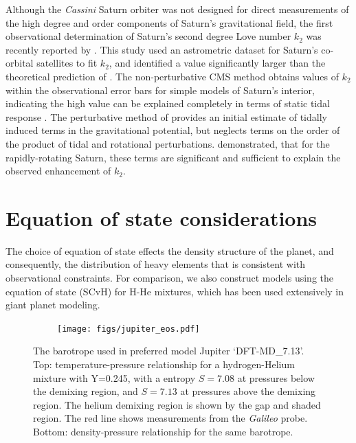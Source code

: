 Although the \textit{Cassini} Saturn orbiter was not designed for direct measurements
of the high degree and order components of Saturn's gravitational field, the first observational
determination of Saturn's second degree Love number $k_2$ was recently reported by
\citet{lainey2016}. This study used an astrometric dataset for Saturn's co-orbital
satellites to fit $k_2$, and identified a value significantly larger than the
theoretical prediction of \citet{gavrilov1977}. The non-perturbative CMS method
obtains values of $k_2$ within the observational error bars for simple models of
Saturn's interior, indicating the high value can be explained completely in terms of
static tidal response \citep{wahl2016}. The perturbative method of
\citet{gavrilov1977} provides an initial estimate of tidally induced terms in the
gravitational potential, but neglects terms on the order of the product of tidal
and rotational perturbations. \citet{wahl2016} demonstrated, that for the
rapidly-rotating Saturn, these terms are significant and sufficient to explain the
observed enhancement of $k_2$.

\section{Equation of state considerations}
The choice of equation of state effects the density structure of the planet, and
consequently, the distribution of heavy elements that is consistent with observational
constraints. For comparison, we also construct models using the \citet{saumon1995}
equation of state (SCvH) for H-He mixtures, which has been used extensively in giant planet
modeling. 

\begin{figure}[h!]  
  \centering
    \texttt{[image: figs/jupiter\_eos.pdf]}
\caption{ The barotrope used in preferred model Jupiter `DFT-MD\_7.13'. Top:
    temperature-pressure relationship for a hydrogen-Helium mixture with Y=0.245,
    with a entropy $S=7.08$ at pressures below the demixing region, and $S=7.13$ at
    pressures above the demixing region. The helium demixing region is shown by the
    gap and shaded region. The red line shows measurements from the \textit{Galileo}
probe. Bottom: density-pressure relationship for the same barotrope.}
\label{fig:eos}
\end{figure}


